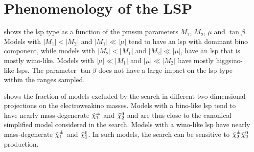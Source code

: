 \FloatBarrier

\section{Phenomenology of the LSP}

 shows the \gls{lsp} type as a function of the \gls{pmssm} parameters $M_1$, $M_2$, $\mu$ and $\tan\beta$. Models with $\vert M_1\vert < \vert M_2\vert$ and $\vert M_1\vert \ll \vert\mu\vert$ tend to have an \gls{lsp} with dominant bino component, while models with $\vert M_2 \vert < \vert M_1 \vert$ and $ \vert M_2 \vert  \ll \vert\mu\vert$, have an \gls{lsp} that is mostly wino-like.
Models with $\vert\mu\vert\ll \vert M_1 \vert$ and $\vert\mu\vert\ll \vert M_2 \vert$ have mostly higgsino-like \glspl{lsp}.
The parameter $\tan\beta$ does not have a large impact on the \gls{lsp} type within the ranges sampled.

 shows the fraction of models excluded by the \onelepton search in different two-dimensional projections on the electroweakino masses.
Models with a bino-like \gls{lsp} tend to have nearly mass-degenerate $\tilde{\chi}_1^\pm$ and $\tilde{\chi}_2^0$ and are thus close to the canonical simplified model considered in the search. Models with a wino-like \gls{lsp} have nearly mass-degenerate $\tilde{\chi}_1^\pm$ and $\tilde{\chi}_1^0$. In such models, the \onelepton search can be sensitive to $\tilde{\chi}_2^\pm\tilde{\chi}_2^0$ production.

